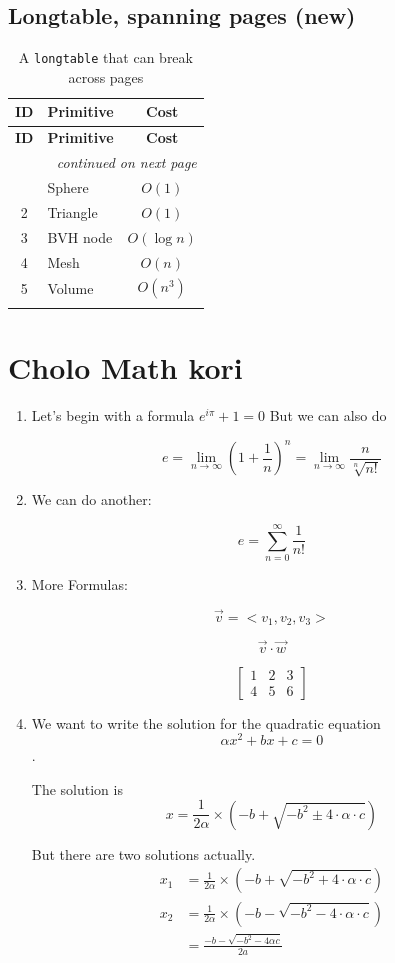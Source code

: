 \documentclass[11pt,a4paper]{article}
\theoremstyle{plain}
\theoremstyle{definition}
\theoremstyle{remark}
\begin{document}
\subsection{Longtable, spanning pages (new)}
\begin{longtable}{|c|l|c|}
\hline
\textbf{ID} & \textbf{Primitive} & \textbf{Cost} \\ \hline
\endfirsthead
\hline
\textbf{ID} & \textbf{Primitive} & \textbf{Cost} \\ \hline
\endhead
\hline \multicolumn{3}{|r|}{\emph{continued on next page}} \\ \hline
\endfoot
\hline
\endlastfoot
1 & Sphere    & $O(1)$ \\ \hline
2 & Triangle  & $O(1)$ \\ \hline
3 & BVH node  & $O(\log n)$ \\ \hline
4 & Mesh      & $O(n)$ \\ \hline
5 & Volume    & $O(n^{3})$ \\ \hline
\caption{A \texttt{longtable} that can break across pages}
\label{tab:longtable}
\end{longtable}

\section{Cholo Math kori}
\begin{enumerate}
\item Let's begin with a formula $e^{i\pi} + 1 = 0$ But we can also do

$$ e = \lim_{n\to\infty} \left(1+\frac{1}{n}\right)^n = \lim_{n\to\infty}\frac{n}{\sqrt[n]{n!}}$$

\item We can do another:

$$ e = \sum_{n=0}^{\infty}\frac{1}{n!}$$

\item More Formulas:

$$  \vec{v} = <v_1,v_2,v_3>$$

$$\vec{v}\cdot \vec{w}$$

$$\begin{bmatrix}
    1 & 2 & 3 \\
    4 & 5 & 6
\end{bmatrix}$$

\item We want to write the solution for the quadratic equation $$\alpha x^2 + bx + c = 0$$.

The solution is
$$ x = \frac{1}{2\alpha} \times \left(-b + \sqrt{-b^2 \pm 4\cdot \alpha \cdot c}\right) $$

But there are two solutions actually.
\begin{align*}
 x_1 & = \frac{1}{2\alpha} \times \left(-b + \sqrt{-b^2 + 4\cdot \alpha \cdot c}\right)  \\
 x_2 & = \frac{1}{2\alpha} \times \left(-b - \sqrt{-b^2 - 4\cdot \alpha \cdot c}\right) \\
 & = \frac{-b - \sqrt{-b^2 - 4 \alpha c}}{2a}
\end{align*}
\end{enumerate}
\end{document}
